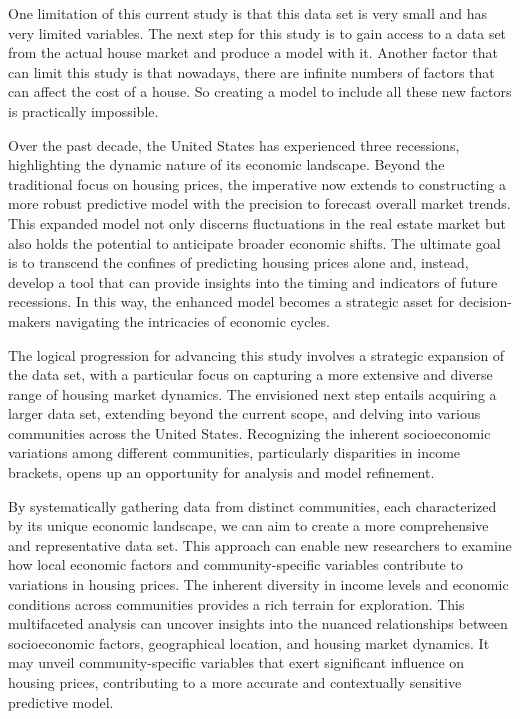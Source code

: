 \documentclass[12pt]{article}
\begin{document}
One limitation of this current study is that this data set is very small and has very limited variables. The next step for this study is to gain access to a data set from the actual house market and produce a model with it. Another factor that can limit this study is that nowadays, there are infinite numbers of factors that can affect the cost of a house. So creating a model to include all these new factors is practically impossible. 

Over the past decade, the United States has experienced three recessions, highlighting the dynamic nature of its economic landscape. Beyond the traditional focus on housing prices, the imperative now extends to constructing a more robust predictive model with the precision to forecast overall market trends. This expanded model not only discerns fluctuations in the real estate market but also holds the potential to anticipate broader economic shifts. The ultimate goal is to transcend the confines of predicting housing prices alone and, instead, develop a tool that can provide insights into the timing and indicators of future recessions. In this way, the enhanced model becomes a strategic asset for decision-makers navigating the intricacies of economic cycles.

The logical progression for advancing this study involves a strategic expansion of the data set, with a particular focus on capturing a more extensive and diverse range of housing market dynamics. The envisioned next step entails acquiring a larger data set, extending beyond the current scope, and delving into various communities across the United States. Recognizing the inherent socioeconomic variations among different communities, particularly disparities in income brackets, opens up an opportunity for analysis and model refinement.

By systematically gathering data from distinct communities, each characterized by its unique economic landscape, we can aim to create a more comprehensive and representative data set. This approach can enable new researchers to examine how local economic factors and community-specific variables contribute to variations in housing prices. The inherent diversity in income levels and economic conditions across communities provides a rich terrain for exploration. This multifaceted analysis can uncover insights into the nuanced relationships between socioeconomic factors, geographical location, and housing market dynamics. It may unveil community-specific variables that exert significant influence on housing prices, contributing to a more accurate and contextually sensitive predictive model.




\medskip

\printbibliography[title={References}]
\end{document}
